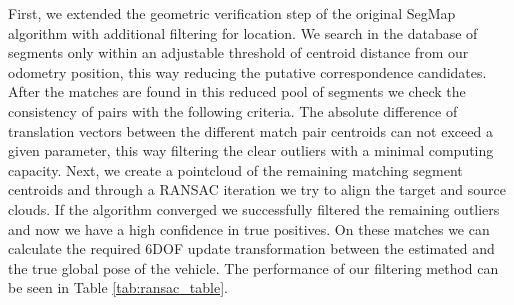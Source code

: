 \documentclass[letterpaper, 10 pt, conference]{ieeeconf}  %
\begin{document}
First, we extended the geometric verification step of the original SegMap algorithm with additional filtering for location. We search in the database of segments only within an adjustable threshold of centroid distance from our odometry position, this way reducing the putative correspondence candidates. After the matches are found in this reduced pool of segments we check the consistency of pairs with the following criteria. The absolute difference of translation vectors between the different match pair centroids can not exceed a given parameter, this way filtering the clear outliers with a minimal computing capacity. 
Next, we create a pointcloud of the remaining matching segment centroids and through a RANSAC iteration we try to align the target and source clouds. If the algorithm converged we successfully filtered the remaining outliers and now we have a high confidence in true positives. On these matches we can calculate the required 6DOF update transformation between the estimated and the true global pose of the vehicle.
The performance of our filtering method can be seen in Table \ref{tab:ransac_table}.
\end{document}
